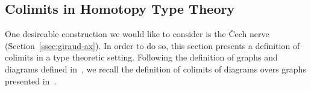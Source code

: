 \documentclass[notfinal]{jfrarticle}
\DeclareMathOperator{\im}{Im}
\newcommand \defeq {\overset{de\hspace{-0.2ex}f}{=}}
\newcommand \fib[2] {\mathrm{fib}_{#1}(#2)}
\newcommand{\ie}{\emph{i.e.}}
\begin{document}




\subsection{Colimits in Homotopy Type Theory }
\label{ssec:colim-homot-type}

One desireable construction we would like to consider is the \v{C}ech
nerve (Section~\ref{ssec:giraud-ax}). In order to do so, this section
presents a definition of colimits in a type theoretic setting.
% 
Following the definition of graphs and diagrams defined
in~\cite{lumsdaine}, we recall the definition of colimits of
diagrams overs graphs presented in~\cite{sets_in_hott}. 
%
\end{document}
